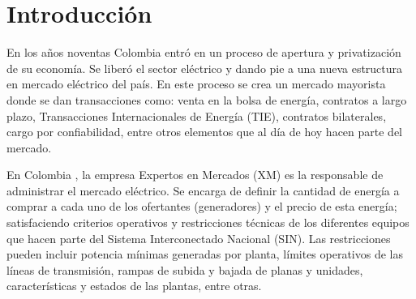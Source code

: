 \chapter{Introducción}\label{ch:introinfo}

En los años noventas Colombia entró en un proceso de apertura y privatización de su economía. Se liberó el sector eléctrico y dando pie a una nueva estructura en   mercado eléctrico del país. En este proceso se crea un mercado mayorista donde se dan transacciones como: venta en la bolsa de energía, contratos a largo plazo, Transacciones Internacionales de Energía (TIE), contratos bilaterales, cargo por confiabilidad, entre otros elementos que al día de hoy hacen parte del mercado.

\noindent En Colombia \cite{rodas_gallego_evaluacion_2016}, la empresa Expertos en Mercados (XM) es la responsable de administrar el mercado eléctrico. Se encarga de definir la cantidad de energía a comprar a cada uno de los ofertantes (generadores) y el precio de esta energía; satisfaciendo criterios operativos y restricciones técnicas de los diferentes equipos que hacen parte del Sistema Interconectado Nacional (SIN). Las restricciones pueden incluir potencia mínimas generadas por planta, límites operativos de las líneas de transmisión, rampas de subida y bajada de planas y unidades, características y estados de las plantas,  entre otras.